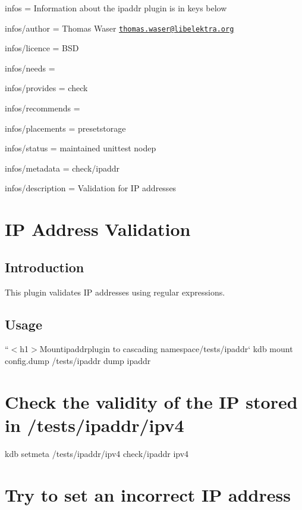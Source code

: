 
\begin{DoxyItemize}
\item infos = Information about the ipaddr plugin is in keys below
\item infos/author = Thomas Waser \href{mailto:thomas.waser@libelektra.org}{\tt thomas.\+waser@libelektra.\+org}
\item infos/licence = B\+SD
\item infos/needs =
\item infos/provides = check
\item infos/recommends =
\item infos/placements = presetstorage
\item infos/status = maintained unittest nodep
\item infos/metadata = check/ipaddr
\item infos/description = Validation for IP addresses
\end{DoxyItemize}\hypertarget{md_src_plugins_ipaddr_README_src_plugins_ipaddr_README_md}{}\section{I\+P Address Validation}\label{md_src_plugins_ipaddr_README_src_plugins_ipaddr_README_md}
\subsection*{Introduction}

This plugin validates IP addresses using regular expressions.

\subsection*{Usage}

``{\ttfamily  $<$h1$>$Mount}ipaddr{\ttfamily plugin to cascading namespace}/tests/ipaddr` kdb mount config.\+dump /tests/ipaddr dump ipaddr

\section*{Check the validity of the IP stored in {\ttfamily /tests/ipaddr/ipv4}}

kdb setmeta /tests/ipaddr/ipv4 check/ipaddr ipv4

\section*{Try to set an incorrect IP address}

